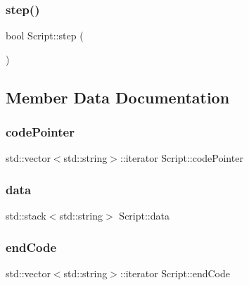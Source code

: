 \mbox{\label{classScript_a8491a3c9b5e51e2bf9c0b6f9bf13f6e9}} 
\subsubsection{\texorpdfstring{step()}{step()}}
{\footnotesize\ttfamily bool Script\+::step (\begin{DoxyParamCaption}{ }\end{DoxyParamCaption})}



\subsection{Member Data Documentation}
\mbox{\label{classScript_ad5811f724787c30487d0af0948015a11}} 
\subsubsection{\texorpdfstring{code\+Pointer}{codePointer}}
{\footnotesize\ttfamily std\+::vector$<$std\+::string$>$\+::iterator Script\+::code\+Pointer\hspace{0.3cm}{\ttfamily [private]}}

\mbox{\label{classScript_a30e43a826a3f24edc5165535de541b6b}} 
\subsubsection{\texorpdfstring{data}{data}}
{\footnotesize\ttfamily std\+::stack$<$std\+::string$>$ Script\+::data\hspace{0.3cm}{\ttfamily [private]}}

\mbox{\label{classScript_abb86519c47bd35608747511fdfdcccfc}} 
\subsubsection{\texorpdfstring{end\+Code}{endCode}}
{\footnotesize\ttfamily std\+::vector$<$std\+::string$>$\+::iterator Script\+::end\+Code\hspace{0.3cm}{\ttfamily [private]}}

